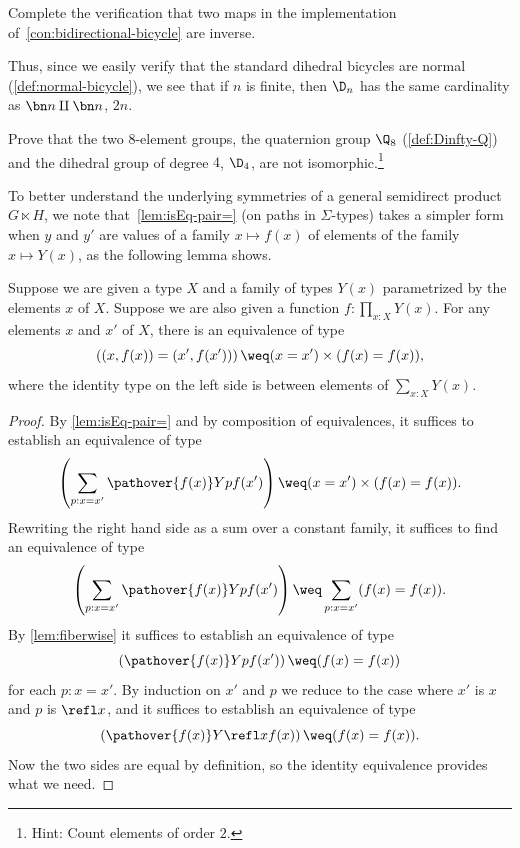 \begin{xca}
  Complete the verification that two maps in the implementation
  of~\cref{con:bidirectional-bicycle} are inverse.
\end{xca}
Thus, since we easily verify that the standard dihedral bicycles are normal
(\cref{def:normal-bicycle}), we see that if $n$ is finite,
then $\D_n$ has the same cardinality as $\bn n \amalg\bn n$, \ie $2n$.
\begin{xca}
  Prove that the two $8$-element groups,
  the quaternion group $\Q_8$ (\cref{def:Dinfty-Q})
  and the dihedral group of degree $4$, $\D_4$, are not isomorphic.\footnote{%
    Hint: Count elements of order $2$.}
\end{xca}

To better understand the underlying symmetries of a general
semidirect product $G\ltimes H$, we note that~\cref{lem:isEq-pair=}
(on paths in $\Sigma$-types)
takes a simpler form when $y$ and $y'$ are values
of a family $x \mapsto f(x)$ of elements
of the family $x \mapsto Y(x)$, as the following lemma shows.

\begin{lemma}\label{lem:pathpairsection}
  Suppose we are given a type $X$ and a family of types $Y(x)$ parametrized by the elements $x$ of $X$.
  Suppose we are also given a function $f : \prod_{x:X} Y(x)$.
  For any elements $x$ and $x'$ of $X$,
  there is an equivalence of type
  $$\left ( (x,f(x)) = (x',f(x')) \right ) \weq (x=x') \times (f(x) = f(x)),$$
  where the identity type on the left side is between elements of $\sum_{x:X} Y(x)$.
\end{lemma}

\begin{proof}
  By \cref{lem:isEq-pair=} and by composition of equivalences, it suffices to establish an equivalence of type
  $$\left( \sum_{p:x=x'} \pathover {f(x)} Y p {f(x')} \right) \weq (x=x') \times (f(x) = f(x)).$$
  Rewriting the right hand side as a sum over a constant family, it suffices to find an equivalence of type
  $$\left( \sum_{p:x=x'} \pathover {f(x)} Y p {f(x')} \right) \weq \sum_{p:x=x'} (f(x) = f(x)).$$
  By \cref{lem:fiberwise} it suffices to establish an equivalence of type
  $$ \left( \pathover {f(x)} Y p {f(x')} \right) \weq (f(x) = f(x))$$
  for each $p:x=x'$.  By induction on $x'$ and $p$ we reduce to the case where $x'$ is $x$ and $p$ is $\refl x$, and it suffices to establish an
  equivalence of type
  $$ \left( \pathover {f(x)} Y {\refl x} {f(x)} \right) \weq (f(x) = f(x)).$$
  Now the two sides are equal by definition, so the identity equivalence provides what we need.
\end{proof}

